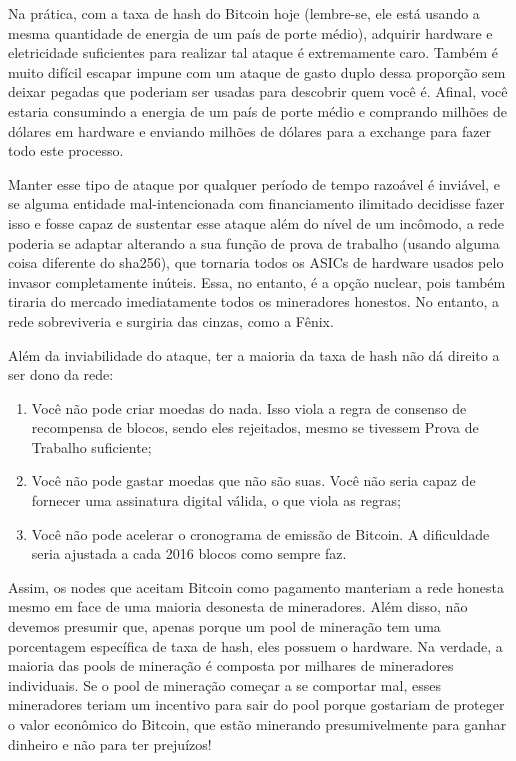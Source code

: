 Na prática, com a taxa de hash do Bitcoin hoje (lembre-se, ele está usando a mesma quantidade de energia de um país de porte médio), adquirir hardware e eletricidade suficientes para realizar tal ataque é extremamente caro. Também é muito difícil escapar impune com um ataque de gasto duplo dessa proporção sem deixar pegadas que poderiam ser usadas para descobrir quem você é. Afinal, você estaria consumindo a energia de um país de porte médio e comprando milhões de dólares em hardware e enviando milhões de dólares para a exchange para fazer todo este processo.

Manter esse tipo de ataque por qualquer período de tempo razoável é inviável, e se alguma entidade mal-intencionada com financiamento ilimitado decidisse fazer isso e fosse capaz de sustentar esse ataque além do nível de um incômodo, a rede poderia se adaptar alterando a sua função de prova de trabalho (usando alguma coisa diferente do sha256), que tornaria todos os ASICs de hardware usados pelo invasor completamente inúteis. Essa, no entanto, é a opção nuclear, pois também tiraria do mercado imediatamente todos os mineradores honestos. No entanto, a rede sobreviveria e surgiria das cinzas, como a Fênix.

Além da inviabilidade do ataque, ter a maioria da taxa de hash não dá direito a ser dono da rede:

\begin{enumerate}
\item Você não pode criar moedas do nada. Isso viola a regra de consenso de recompensa de blocos, sendo eles rejeitados, mesmo se tivessem Prova de Trabalho suficiente;
\item Você não pode gastar moedas que não são suas. Você não seria capaz de fornecer uma assinatura digital válida, o que viola as regras;
\item Você não pode acelerar o cronograma de emissão de Bitcoin. A dificuldade seria ajustada a cada 2016 blocos como sempre faz.
\end{enumerate}

Assim, os nodes que aceitam Bitcoin como pagamento manteriam a rede honesta mesmo em face de uma maioria desonesta de mineradores. Além disso, não devemos presumir que, apenas porque um pool de mineração tem uma porcentagem específica de taxa de hash, eles possuem o hardware. Na verdade, a maioria das pools de mineração é composta por milhares de mineradores individuais. Se o pool de mineração começar a se comportar mal, esses mineradores teriam um incentivo para sair do pool porque gostariam de proteger o valor econômico do Bitcoin, que estão minerando presumivelmente para ganhar dinheiro e não para ter prejuízos!

